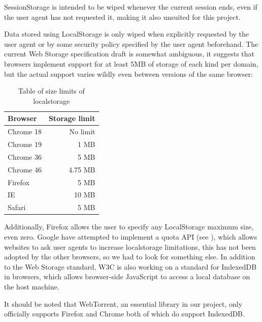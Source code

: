 SessionStorage is intended to be wiped whenever the current session ends, 
even if the user agent has not requested it, making it also unsuited for this project.

Data stored using LocalStorage is only wiped when explicitly requested by the user agent or 
by some security policy specified by the user agent beforehand.
\newline\newline
The current Web Storage specification draft is somewhat ambiguous, 
it suggests that browsers implement support for at least 5MB of storage of each kind per domain,
but the actual support varies wildly even between versions of the same browser:

\begin{table}[h]
	\centering
	\begin{tabular}{l | r}
        Browser   & Storage limit \\ \hline
		Chrome 18 & No limit  \\
		Chrome 19 & 1    MB   \\
		Chrome 36 & 5    MB   \\
		Chrome 46 & 4.75 MB   \\
		Firefox   & 5    MB   \\
		IE        & 10   MB   \\
		Safari    & 5    MB   \\
	\end{tabular}
	\caption{Table of size limits of localstorage}
	\label{table:browserls}
\end{table}

Additionally, Firefox allows the user to specify any LocalStorage maximum size, even zero. 
Google have attempted to implement a quota \acs{API} (see \citep{QuotaAPI}), 
which allows websites to ask user agents to increase localstorage limitations,
this has not been adopted by the other browsers, so we had to look for something else.
\newline\newline
In addition to the Web Storage standard, W3C is also working on a standard for IndexedDB in browsers, 
which allows browser-side JavaScript to access a local database on the host machine.

It should be noted that WebTorrent, 
an essential library in our project, 
only officially supports Firefox and Chrome 
both of which do support IndexedDB.

